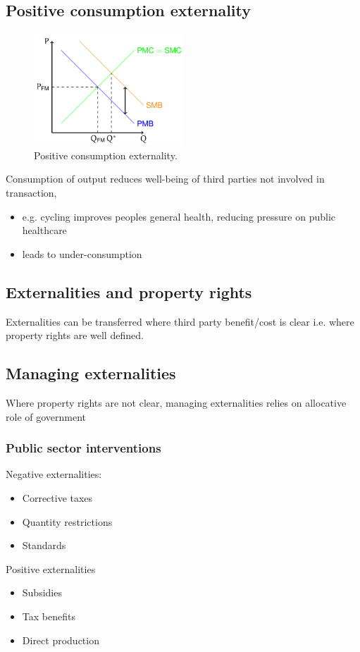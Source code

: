 \subsection{Positive consumption externality}
\begin{figure}[H]
  \centering
  \includegraphics[width = 0.5\textwidth]{./img/figure19.png}
  \caption{Positive consumption externality.}
\end{figure}
Consumption of output reduces well-being of third parties not involved in transaction,
\begin{itemize}
  \item e.g. cycling improves peoples general health, reducing pressure on public healthcare
  \item leads to under-consumption
\end{itemize}
\subsection{Externalities and property rights}
Externalities can be transferred where third party benefit/cost is clear i.e. where property rights are well defined.
\subsection{Managing externalities}
Where property rights are not clear, managing externalities relies on allocative role of government
\subsubsection{Public sector interventions}
Negative externalities:
\begin{itemize}
  \item Corrective taxes
  \item Quantity restrictions
  \item Standards
\end{itemize}
Positive externalities
\begin{itemize}
  \item Subsidies
  \item Tax benefits
  \item Direct production
\end{itemize}
